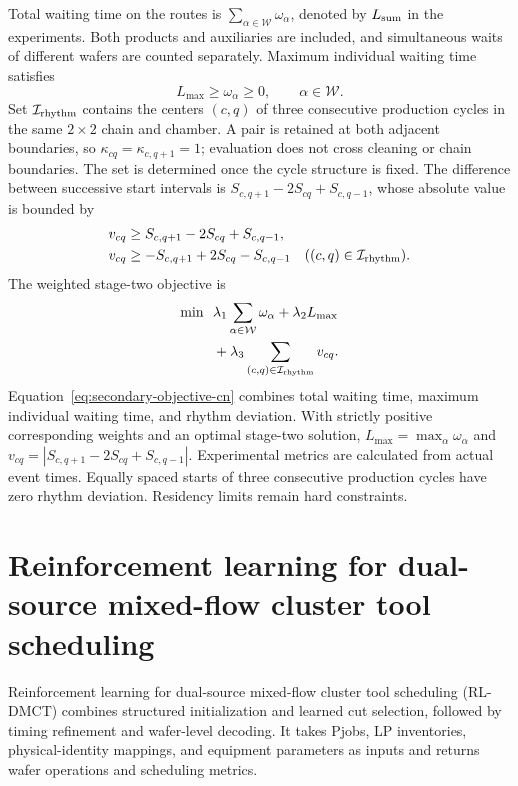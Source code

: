 \documentclass[final,5p,times,twocolumn]{elsarticle}
\newcounter{algorithm}
\begin{document}
Total waiting time on the routes is $\sum_{\alpha\in\mathcal W}\omega_\alpha$, denoted by $L_{\rm sum}$ in the experiments. Both products and auxiliaries are included, and simultaneous waits of different wafers are counted separately. Maximum individual waiting time satisfies
\begin{equation}
L_{\max}\ge\omega_\alpha\ge0,\qquad \alpha\in\mathcal W.
\label{eq:secondary-wait-cn}
\end{equation}
Set $\mathcal I_{\rm rhythm}$ contains the centers $(c,q)$ of three consecutive production cycles in the same $2\times2$ chain and chamber. A pair is retained at both adjacent boundaries, so $\kappa_{cq}=\kappa_{c,q+1}=1$; evaluation does not cross cleaning or chain boundaries. The set is determined once the cycle structure is fixed. The difference between successive start intervals is $S_{c,q+1}-2S_{cq}+S_{c,q-1}$, whose absolute value is bounded by
\begin{equation}
\begin{aligned}
v_{cq}&\ge S_{c,q+1}-2S_{cq}+S_{c,q-1},\\
v_{cq}&\ge-S_{c,q+1}+2S_{cq}-S_{c,q-1}
\quad((c,q)\in\mathcal I_{\rm rhythm}).
\end{aligned}
\label{eq:secondary-rhythm-cn}
\end{equation}
The weighted stage-two objective is
\begin{equation}
\begin{aligned}
\min\ \ &\lambda_1\sum_{\alpha\in\mathcal W}\omega_\alpha+\lambda_2L_{\max}\\
&+\lambda_3\sum_{(c,q)\in\mathcal I_{\rm rhythm}}v_{cq}.
\end{aligned}
\label{eq:secondary-objective-cn}
\end{equation}
Equation~\eqref{eq:secondary-objective-cn} combines total waiting time, maximum individual waiting time, and rhythm deviation. With strictly positive corresponding weights and an optimal stage-two solution, $L_{\max}=\max_\alpha\omega_\alpha$ and $v_{cq}=|S_{c,q+1}-2S_{cq}+S_{c,q-1}|$. Experimental metrics are calculated from actual event times. Equally spaced starts of three consecutive production cycles have zero rhythm deviation. Residency limits remain hard constraints.

\section{Reinforcement learning for dual-source mixed-flow cluster tool scheduling}
\label{sec:algorithm-cn}
Reinforcement learning for dual-source mixed-flow cluster tool scheduling (RL-DMCT) combines structured initialization and learned cut selection, followed by timing refinement and wafer-level decoding. It takes Pjobs, LP inventories, physical-identity mappings, and equipment parameters as inputs and returns wafer operations and scheduling metrics.
\end{document}

